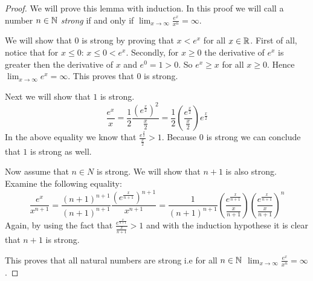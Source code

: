 \begin{proof}
	We will prove this lemma with induction. In this proof we will call a number
	$n \in \mathbb{N}$ \emph{strong} if and only if
	$\lim_{x \rightarrow \infty} \frac{e^{x}}{x^{n}} = \infty$.
	
	We will show that $0$ is strong by proving that $x \lt e^{x}$ for all 
	$x \in \mathbb{R}$. First of all, notice that for $x \le 0$: $x \le 0 \lt e^{x}$.
	Secondly, for $x \ge 0$	the derivative of $e^{x}$ is greater then the 
	derivative of $x$ and $e^{0} = 1 \gt 0$. So $e^{x} \ge x$ for all $x \ge 0$.
	Hence $\lim_{x \rightarrow \infty} e^{x} = \infty$. This proves that $0$
	is strong.
	
	Next we will show that $1$ is strong.
	\[
		\frac{e^{x}}{x} =%
		\frac{1}{2}\frac{\left(e^{\frac{x}{2}}\right)^2}{\frac{x}{2}} =%
		\frac{1}{2}\left(\frac{e^{\frac{x}{2}}}{\frac{x}{2}}\right)e^{\frac{x}{2}}
	\]
	In the above equality we know that 
	$\frac{e^{\frac{x}{2}}}{\frac{x}{2}} > 1$. Because $0$ is strong we can
	conclude that $1$ is strong as well.
	
	Now assume that $n \in N$ is strong. We will show that $n+1$ is also strong.
	Examine the following equality:
	\[
		\frac{e^{x}}{x^{n+1}} =%
		\frac{(n+1)^{n+1}}{(n+1)^{n+1}}%
		\frac{\left(e^{\frac{x}{n+1}}\right)^{n+1}}{x^{n+1}} =%
		\frac{1}{(n+1)^{n+1}}%
		\left(\frac{e^{\frac{x}{n+1}}}{\frac{x}{n+1}}\right)%
		\left(\frac{e^{\frac{x}{n+1}}}{\frac{x}{n+1}}\right)^{n}%
	\]
	Again, by using the fact that $\frac{e^{\frac{x}{n+1}}}{\frac{x}{n+1}} > 1$
	and with the induction hypothese it is clear that $n+1$ is strong.
	
	This proves that all natural numbers are strong i.e for all $n \in \mathbb{N}$
	$\lim_{x \rightarrow \infty} \frac{e^{x}}{x^{n}} = \infty$.
\end{proof}

